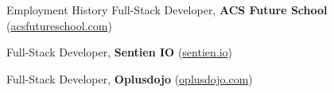 \begin{rubric}{Employment History}
%
	Full-Stack Developer, \textbf{ACS Future School} (\href{https://www.acsfutureschool.com}{acsfutureschool.com})

%
	Full-Stack Developer, \textbf{Sentien IO} (\href{https://sentien.io}{sentien.io})

%
	Full-Stack Developer, \textbf{Oplusdojo} (\href{https://www.oplusdojo.com}{oplusdojo.com})

\end{rubric}